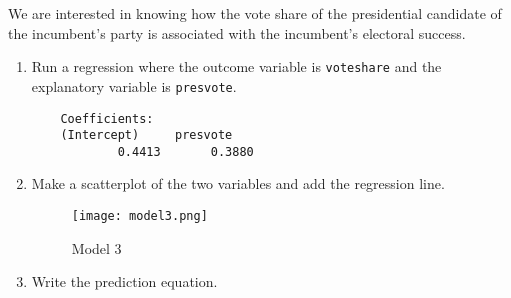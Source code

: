 \documentclass[12pt,letterpaper]{article}
\begin{document}
\noindent We are interested in knowing how the vote share of the presidential candidate of the incumbent's party is associated with the incumbent's electoral success.
	\vspace{.25cm}
	\begin{enumerate}
		\item Run a regression where the outcome variable is \texttt{voteshare} and the explanatory variable is \texttt{presvote}.

	  
	\begin{verbatim}
	Coefficients:
	(Intercept)     presvote  
			0.4413       0.3880 
	\end{verbatim}
	\vspace{2cm}
	\item Make a scatterplot of the two variables and add the regression line. 	
	 
	\begin{figure}[h!]
		\caption{\footnotesize{Model 3}}
		\vspace{.5cm}
		\centering
		\label{fig:Model 3}			
		\texttt{[image: model3.png]}
	\end{figure}		
	\vspace{2cm}
	\item Write the prediction equation.
	 
	\end{enumerate}

\newpage	
\end{document}
